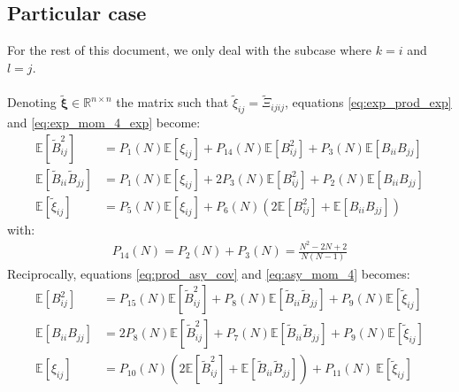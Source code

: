 \documentclass[12pt]{scrartcl}
\begin{document}
\subsection{Particular case}
For the rest of this document, we only deal with the subcase where $k=i$ and $l=j$.\\
$ $\\
Denoting $\widetilde{\boldsymbol{\xi}} \in \mathbb{R}^{n \times n}$ the matrix such that $\widetilde{\xi}_{ij} = \widetilde{\Xi}_{ijij}$, equations \eqref{eq:exp_prod_exp} and \eqref{eq:exp_mom_4_exp} become:
\begin{subequations}
\begin{align}
\label{eq:exp_prod_exp_2}
\mathbb{E} \left[\widetilde{B}_{ij}^2\right] & = P_1(N) \mathbb{E} \left[\xi_{ij}\right] + P_{14}(N) \mathbb{E} \left[B^2_{ij}\right] + P_3(N) \mathbb{E} \left[B_{ii} B_{jj}\right] \\
\label{eq:exp_prod_exp_3}
\mathbb{E} \left[\widetilde{B}_{ii} \widetilde{B}_{jj}\right] & = P_1(N) \mathbb{E} \left[\xi_{ij}\right] + 2 P_3(N) \mathbb{E} \left[B^2_{ij}\right] + P_2(N) \mathbb{E} \left[B_{ii} B_{jj}\right] \\
\label{eq:exp_mom_4_exp_2}
\mathbb{E} \left[\widetilde{\xi}_{ij}\right] & = P_5(N) \mathbb{E} \left[\xi_{ij} \right] + P_6(N) \left(2 \mathbb{E} \left[B^2_{ij}\right] + \mathbb{E} \left[B_{ii} B_{jj}\right] \right)
\end{align}
\end{subequations}
with:
\begin{align}
P_{14}(N) = P_2(N) + P_3(N) =  \frac{N^2-2N+2}{N(N-1)}
\end{align}
Reciprocally, equations \eqref{eq:prod_asy_cov} and \eqref{eq:asy_mom_4} becomes:
\begin{subequations}
\begin{align}
\label{eq:prod_asy_cov_exp_2}
\mathbb{E} \left[B^2_{ij}\right] & = P_{15}(N) \mathbb{E} \left[\widetilde{B}^2_{ij}\right] + P_8(N) \mathbb{E} \left[\widetilde{B}_{ii} \widetilde{B}_{jj}\right] + P_9(N) \mathbb{E} \left[\widetilde{\xi}_{ij}\right] \\
\label{eq:prod_asy_cov_exp_3}
\mathbb{E} \left[B_{ii} B_{jj}\right] & = 2P_8(N) \mathbb{E} \left[\widetilde{B}^2_{ij}\right] + P_7(N) \mathbb{E} \left[\widetilde{B}_{ii} \widetilde{B}_{jj}\right] + P_9(N) \mathbb{E} \left[\widetilde{\xi}_{ij}\right] \\
\label{eq:asy_mom_4_exp_2}
\mathbb{E} \left[\xi_{ij}\right] & = P_{10}(N) \left(2 \mathbb{E} \left[\widetilde{B}_{ij}^2\right] + \mathbb{E} \left[\widetilde{B}_{ii} \widetilde{B}_{jj}\right] \right) + P_{11}(N) \ \mathbb{E} \left[\widetilde{\xi}_{ij}\right]
\end{align}
\end{subequations}
\end{document}
